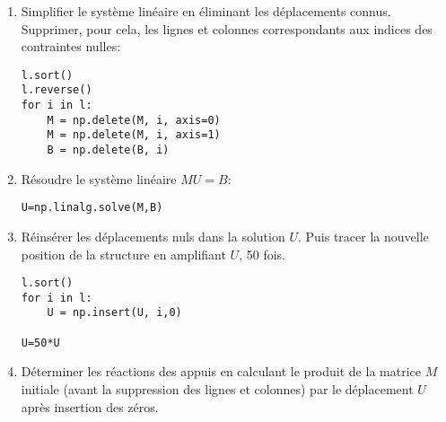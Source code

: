 \documentclass[11pt]{article}
\begin{document}
\begin{enumerate}
\item Simplifier le système linéaire en éliminant les déplacements connus. Supprimer, pour cela, les lignes et colonnes correspondants aux indices des contraintes nulles:
\begin{verbatim}
l.sort()
l.reverse()
for i in l:
    M = np.delete(M, i, axis=0)
    M = np.delete(M, i, axis=1)
    B = np.delete(B, i)
\end{verbatim}
\item Résoudre le système linéaire $MU=B$:
\begin{verbatim}
U=np.linalg.solve(M,B)
\end{verbatim}
\item Réinsérer les déplacements nuls dans la solution $U$. Puis tracer la nouvelle position de la structure en amplifiant $U$, 50 fois.
\begin{verbatim}
l.sort()
for i in l:
    U = np.insert(U, i,0)

U=50*U
\end{verbatim}
\item Déterminer les réactions des appuis en calculant le produit de la matrice $M$ initiale (avant la suppression des lignes et colonnes) par le déplacement $U$ après insertion des zéros.
\end{enumerate}

\end{document}

